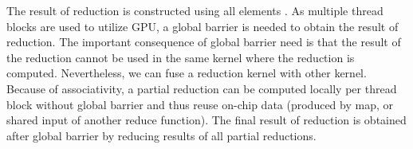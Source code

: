 \documentclass[final]{siamltex}
\begin{document}
\begin{center}

\end{center}

The result of reduction is constructed using all elements . As multiple thread blocks are used to utilize GPU, a global barrier is needed to obtain the result of reduction. The important consequence of global barrier need is that the result of the reduction cannot be used in the same kernel where the reduction is computed. Nevertheless, we can fuse a reduction kernel with other kernel. Because of  associativity, a partial reduction can be computed locally per thread block without global barrier and thus reuse on-chip data (produced by map, or shared input of another reduce function). The final result of reduction is obtained after global barrier by reducing results of all partial reductions. 
\end{document}

